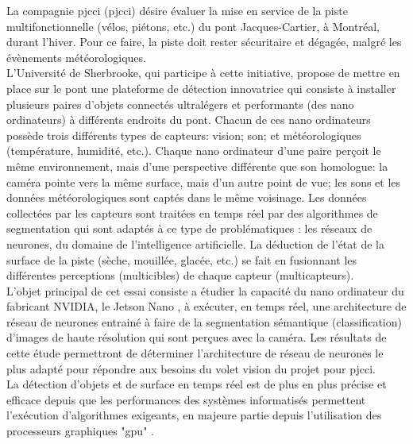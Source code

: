 ﻿\noindent La compagnie \acrlong{pjcci} (\acrshort{pjcci}) désire évaluer la mise en service de la piste multifonctionnelle (vélos, piétons, etc.) du pont Jacques-Cartier, à Montréal, durant l'hiver. Pour ce faire, la piste doit rester sécuritaire et dégagée, malgré les évènements météorologiques.
\vspace{\baselineskip}
\\
\noindent L'Université de Sherbrooke, qui participe à cette initiative, propose de mettre en place sur le pont une plateforme de détection innovatrice qui consiste à installer plusieurs paires d'objets connectés ultralégers et performants (des nano ordinateurs) à différents endroits du pont. Chacun de ces nano ordinateurs possède trois différents types de capteurs: vision; son; et météorologiques (température, humidité, etc.). Chaque nano ordinateur d'une paire perçoit le même environnement, mais d'une perspective différente que son homologue: la caméra pointe vers la même surface, mais d'un autre point de vue; les sons et les données météorologiques sont captés dans le même voisinage. Les données collectées par les capteurs sont traitées en temps réel par des algorithmes de segmentation qui sont adaptés à ce type de problématiques : les réseaux de neurones, du domaine de l'intelligence artificielle. La déduction de l'état de la surface de la piste (sèche, mouillée, glacée, etc.) se fait en fusionnant les différentes perceptions (multicibles) de chaque capteur (multicapteurs).
\vspace{\baselineskip}
\\
\noindent L'objet principal de cet essai consiste a étudier la capacité du nano ordinateur du fabricant NVIDIA, le Jetson Nano \parencite{nvidia_jetson_2019}, à exécuter, en temps réel, une architecture de réseau de neurones entrainé à faire de la segmentation sémantique (classification) d'images de haute résolution qui sont perçues avec la caméra. Les résultats de cette étude permettront de déterminer l'architecture de réseau de neurones le plus adapté pour répondre aux besoins du volet vision du projet pour \acrshort{pjcci}. 
\vspace{\baselineskip}
\\
\noindent La détection d'objets et de surface en temps réel est de plus en plus précise et efficace depuis que les performances des systèmes informatisés permettent l'exécution d'algorithmes exigeants, en majeure partie depuis l'utilisation des processeurs graphiques "\acrshort{gpu}" \parencite{chong_real-time_1992, dettmers_deep_2015, beam_deep_2017, jiaconda_concise_2019, zheng_real-time_2020, kurenkov_brief_2015}. 
